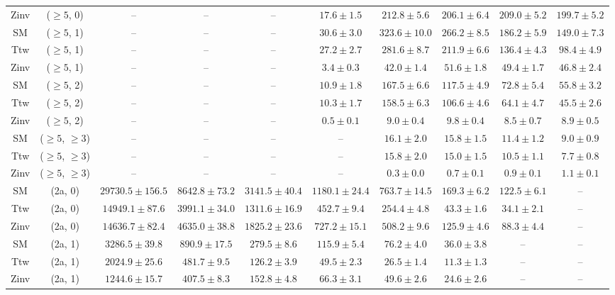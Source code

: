 \begin{table}[h!]
{\begin{tabular}{cccccccccc}
	Zinv & ($\ge5$, 0) & -- & -- & -- & $17.6\pm 1.5$ & $212.8\pm 5.6$ & $206.1\pm 6.4$ & $209.0\pm 5.2$ & $199.7\pm 5.2$ \\[0.5ex] 
	SM & ($\ge5$, 1) & -- & -- & -- & $30.6\pm 3.0$ & $323.6\pm 10.0$ & $266.2\pm 8.5$ & $186.2\pm 5.9$ & $149.0\pm 7.3$ \\[0.5ex] 
	Ttw & ($\ge5$, 1) & -- & -- & -- & $27.2\pm 2.7$ & $281.6\pm 8.7$ & $211.9\pm 6.6$ & $136.4\pm 4.3$ & $98.4\pm 4.9$ \\[0.5ex] 
	Zinv & ($\ge5$, 1) & -- & -- & -- & $3.4\pm 0.3$ & $42.0\pm 1.4$ & $51.6\pm 1.8$ & $49.4\pm 1.7$ & $46.8\pm 2.4$ \\[0.5ex] 
	SM & ($\ge5$, 2) & -- & -- & -- & $10.9\pm 1.8$ & $167.5\pm 6.6$ & $117.5\pm 4.9$ & $72.8\pm 5.4$ & $55.8\pm 3.2$ \\[0.5ex] 
	Ttw & ($\ge5$, 2) & -- & -- & -- & $10.3\pm 1.7$ & $158.5\pm 6.3$ & $106.6\pm 4.6$ & $64.1\pm 4.7$ & $45.5\pm 2.6$ \\[0.5ex] 
	Zinv & ($\ge5$, 2) & -- & -- & -- & $0.5\pm 0.1$ & $9.0\pm 0.4$ & $9.8\pm 0.4$ & $8.5\pm 0.7$ & $8.9\pm 0.5$ \\[0.5ex] 
	SM & ($\ge5$, $\ge3$) & -- & -- & -- & -- & $16.1\pm 2.0$ & $15.8\pm 1.5$ & $11.4\pm 1.2$ & $9.0\pm 0.9$ \\[0.5ex] 
	Ttw & ($\ge5$, $\ge3$) & -- & -- & -- & -- & $15.8\pm 2.0$ & $15.0\pm 1.5$ & $10.5\pm 1.1$ & $7.7\pm 0.8$ \\[0.5ex] 
	Zinv & ($\ge5$, $\ge3$) & -- & -- & -- & -- & $0.3\pm 0.0$ & $0.7\pm 0.1$ & $0.9\pm 0.1$ & $1.1\pm 0.1$ \\[0.5ex] 
	SM & (2a, 0) & $29730.5\pm 156.5$ & $8642.8\pm 73.2$ & $3141.5\pm 40.4$ & $1180.1\pm 24.4$ & $763.7\pm 14.5$ & $169.3\pm 6.2$ & $122.5\pm 6.1$ & -- \\[0.5ex] 
	Ttw & (2a, 0) & $14949.1\pm 87.6$ & $3991.1\pm 34.0$ & $1311.6\pm 16.9$ & $452.7\pm 9.4$ & $254.4\pm 4.8$ & $43.3\pm 1.6$ & $34.1\pm 2.1$ & -- \\[0.5ex] 
	Zinv & (2a, 0) & $14636.7\pm 82.4$ & $4635.0\pm 38.8$ & $1825.2\pm 23.6$ & $727.2\pm 15.1$ & $508.2\pm 9.6$ & $125.9\pm 4.6$ & $88.3\pm 4.4$ & -- \\[0.5ex] 
	SM & (2a, 1) & $3286.5\pm 39.8$ & $890.9\pm 17.5$ & $279.5\pm 8.6$ & $115.9\pm 5.4$ & $76.2\pm 4.0$ & $36.0\pm 3.8$ & -- & -- \\[0.5ex] 
	Ttw & (2a, 1) & $2024.9\pm 25.6$ & $481.7\pm 9.5$ & $126.2\pm 3.9$ & $49.5\pm 2.3$ & $26.5\pm 1.4$ & $11.3\pm 1.3$ & -- & -- \\[0.5ex] 
	Zinv & (2a, 1) & $1244.6\pm 15.7$ & $407.5\pm 8.3$ & $152.8\pm 4.8$ & $66.3\pm 3.1$ & $49.6\pm 2.6$ & $24.6\pm 2.6$ & -- & -- \\[0.5ex] 

\end{tabular}}
\end{table}
